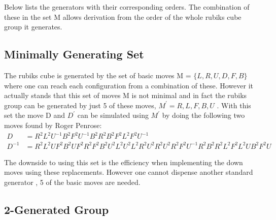 \documentclass{article}
\begin{document}
Below lists the generators with their corresponding orders. The combination of these in the set M allows derivation from the order of the whole rubiks cube group it generates.


\subsection{Minimally Generating Set}

The rubiks cube is generated by the set of basic moves M = $\{L,R,U,D,F,B\}$ where one can reach each configuration from a combination of these. However it actually stands that this set of moves M is not minimal and in fact the rubiks group can be generated by just 5 of these moves, $M^{'} = R,L,F,B,U$ \cite{bandelow2012inside}. With this set the move D and $D^{'}$ can be simulated using $M^{'}$ by doing the following two moves found by Roger Penrose:
\begin{align*}
D &= R^{2}L^{2}U^{-1}B^{2}F^{2}U^{-1}B^{2}R^{2}B^{2}F^{2}L^{2}F^{2}U^{-1} \\
D^{-1} &= R^{2}L^{2}UF^{2}B^{2}UF^{2}R^{2}F^{2}B^{2}U^{2}L^{2}U^{2}L^{2}R^{2}U^{2}R^{2}U^{2}R^{2}F^{2}U^{-1}R^{2}B^{2}R^{2}L^{2}F^{2}L^{2}UB^{2}F^{2}U
\end{align*}

The downside to using this set is the efficiency when implementing the down moves using these replacements. However one cannot dispense another standard generator , 5 of the basic moves are needed.

\subsection{2-Generated Group}
\end{document}
